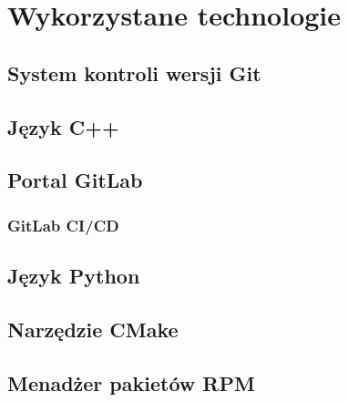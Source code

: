 \chapter{Wykorzystane technologie}
\label{ch:technologies}

\section{System kontroli wersji Git} %
\section{Język C++} %
\section{Portal GitLab}
    \subsection{GitLab CI/CD}
\section{Język Python}
\section{Narzędzie CMake} %
\section{Menadżer pakietów RPM}
